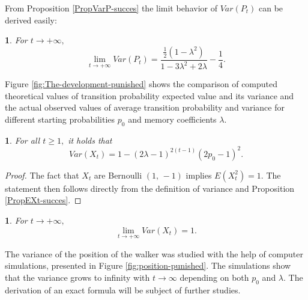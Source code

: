 \documentclass{amsart}
\theoremstyle{definition}
\theoremstyle{plain}
\newtheorem{prop}[thm]{\protect\propositionname}
\theoremstyle{plain}
\newtheorem{cor}[thm]{\protect\corollaryname}
\theoremstyle{plain}
\numberwithin{equation}{section}
\providecommand{\corollaryname}{Corollary}
\providecommand{\propositionname}{Proposition}
\begin{document}
From Proposition \ref{PropVarP-succes} the limit behavior of $Var(P_{t})$
can be derived easily:

\begin{cor}
For $t\rightarrow+\infty,$ \textup{
\begin{equation}
\lim_{t\to+\infty}Var(P_{t})=\frac{\frac{1}{2}(1-\lambda^{2})}{1-3\lambda^{2}+2\lambda}-\frac{1}{4}.\label{eq:CoroVarpt-statement}
\end{equation}
}
\end{cor}

Figure \ref{fig:The-development-punished} shows the comparison of
computed theoretical values of transition probability expected value and its variance and the actual observed values of average transition
probability and variance for different starting probabilities $p_{0}$
and memory coefficients $\lambda$.


\begin{prop}\label{propVarX}
For all $t\geq1,$ it holds that
\begin{equation}
Var(X_{t})=1-(2\lambda-1)^{2(t-1)}(2p_{0}-1)^2.
\end{equation}
\end{prop}
\begin{proof}
The fact that $X_t$ are Bernoulli $(1,\,-1)$ implies $E(X_{t}^2)=1$. The statement then follows directly from the definition of variance and Proposition \ref{PropEXt-succes}.
\end{proof}


\begin{cor}
For $t\rightarrow+\infty,$ \textup{
\begin{equation}
\lim_{t\to+\infty}Var(X_{t})=1.
\end{equation}
}
\end{cor}

The variance of the position of the walker was studied with the help of computer simulations, presented in Figure \ref{fig:position-punished}. The simulations show that the variance grows to infinity with $t\rightarrow\infty$ depending on both $p_0$ and $\lambda$. The derivation of an exact formula will be subject of further studies.
\end{document}
